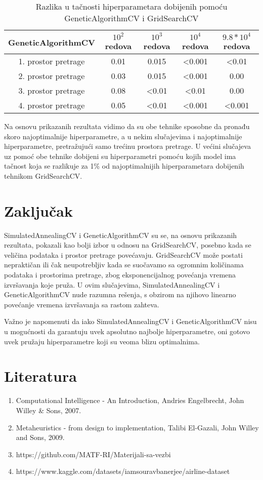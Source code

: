 \documentclass{article}
\begin{document}
\begin{table}[h]
\centering
\begin{tabular}{|c|c|c|c|c|}
\hline
 GeneticAlgorithmCV& $10^2$ redova & $10^3$ redova & $10^4$ redova & $9.8*10^4$ redova \\
\hline
1. prostor pretrage & 0.01 & 0.015 & <0.001 & <0.01\\
\hline
2. prostor pretrage & 0.03 & 0.015 & <0.001 & 0.00\\
\hline
3. prostor pretrage & 0.08 & <0.01 & <0.01 & 0.00\\
\hline
4. prostor pretrage & 0.05 & <0.01  & <0.001 & <0.001\\
\hline
\end{tabular}
\caption{Razlika u tačnosti hiperparametara dobijenih pomoću GeneticAlgorithmCV i GridSearchCV}
\end{table}
\vspace{0.25 cm}

\noindent Na osnovu prikazanih rezultata vidimo da su obe tehnike sposobne da pronađu skoro najoptimalnije hiperparametre, a u nekim slučajevima i najoptimalnije hiperparametre, pretražujući samo trećinu prostora pretrage. U većini slučajeva uz pomoć obe tehnike dobijeni su hiperparametri pomoću kojih model ima tačnost koja se razlikuje za 1\% od najoptimalnijih hiperparametara dobijenih tehnikom GridSearchCV. 
\vspace{0.25 cm}
\section{Zaključak}
\vspace{0.5 cm}
SimulatedAnnealingCV i GeneticAlgorithmCV su se, na osnovu prikazanih rezultata, pokazali kao bolji izbor u odnosu na GridSearchCV, posebno kada se veličina podataka i prostor pretrage povećavaju. GridSearchCV može postati nepraktičan ili čak neupotrebljiv kada se suočavamo sa ogromnim količinama podataka i prostorima pretrage, zbog eksponencijalnog povećanja vremena izvršavanja koje pruža. U ovim slučajevima, SimulatedAnnealingCV i GeneticAlgorithmCV nude razumna rešenja, s obzirom na njihovo linearno povećanje vremena izvršavanja sa rastom zahteva.\newline

\noindent Važno je napomenuti da iako SimulatedAnnealingCV i GeneticAlgorithmCV nisu u mogućnosti da garantuju uvek apsolutno najbolje hiperparametre, oni gotovo uvek pružaju hiperparametre koji su veoma blizu optimalnima.
\newpage
\section{Literatura}
\begin{enumerate}
    \item Computational Intelligence - An Introduction, Andries Engelbrecht, John Willey \& Sons, 2007.
    \item Metaheuristics - from design to implementation, Talibi El-Gazali, John Willey and Sons, 2009.
    \item https://github.com/MATF-RI/Materijali-sa-vezbi
    \item https://www.kaggle.com/datasets/iamsouravbanerjee/airline-dataset
\end{enumerate}
\end{document}
